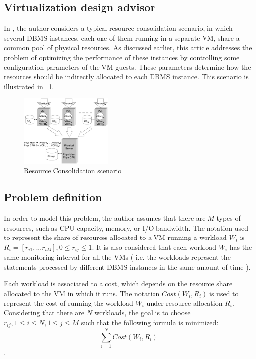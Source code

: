 \documentclass[jidm,a4paper]{jidm} %
\begin{document}
\subsection{Virtualization design advisor}

\label{chap:virtualization}


In \cite{Soror:2008:AVM:1376616.1376711}, the author considers a typical resource consolidation scenario, in which several DBMS instances, each one of them running in a separate VM, share a common pool of physical resources. As discussed earlier, this article addresses the problem of optimizing the performance of these instances by controlling some configuration parameters of the VM guests. These parameters determine how the resources should be indirectly allocated to each DBMS instance. This scenario is illustrated in ~\ref{fig:scenario}.


\begin{figure}[t]
\centering
\includegraphics[width=0.4\textwidth]{dbms_consolidation.eps}
\caption{Resource Consolidation scenario}
\label{fig:scenario}
\end{figure} 

\subsection{Problem definition}

In order to model this problem, the author assumes that there are  $M$ types of resources, such as CPU capacity, memory, or I/O bandwidth. The notation used to represent the share of resources allocated to a VM running a workload $W_{i}$ is $R_{i} = [r_{i1},...r_{iM}], 0 \leq r_{ij} \leq 1$. It is also considered that each workload $W_{i}$ has the same monitoring interval for all the VMs ( i.e. the workloads represent the statements processed by different DBMS instances in the same amount of time ).

Each workload is associated to a cost, which depends on the resource share allocated to the VM in which it runs. The notation $Cost(W_{i},R_{i})$ is used to represent the cost of running the workload $W_{i}$ under resource allocation $R_{i}$. Considering that there are $N$ workloads, the goal is to choose $r_{ij}, 1 \leq i \leq N, 1 \leq j \leq M$ such that the following formula is minimized:
\[
  \sum_{i=1}^{N} Cost(W_{i},R_{i})
\].
\end{document}
